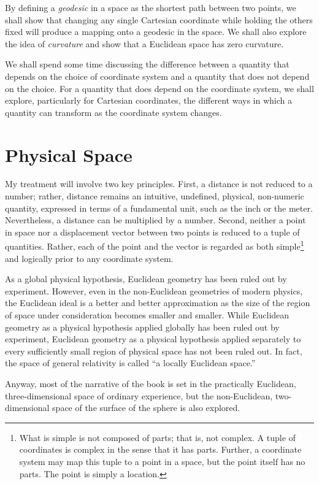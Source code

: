 By defining a \emph{geodesic} in a space as the shortest path between two
points, we shall show that changing any single Cartesian coordinate while
holding the others fixed will produce a mapping onto a geodesic in the space.
We shall also explore the idea of \emph{curvature} and show that a Euclidean
space has zero curvature.

We shall spend some time discussing the difference between a quantity that
depends on the choice of coordinate system and a quantity that does not depend
on the choice.  For a quantity that does depend on the coordinate system, we
shall explore, particularly for Cartesian coordinates, the different ways in
which a quantity can transform as the coordinate system changes.

\section{Physical Space}

My treatment will involve two key principles.  First, a distance is not reduced
to a number; rather, distance remains an intuitive, undefined, physical,
non-numeric quantity, expressed in terms of a fundamental unit, such as the
inch or the meter.  Nevertheless, a distance can be multiplied by a number.
Second, neither a point in space nor a displacement vector between two points
is reduced to a tuple of quantities.  Rather, each of the point and the vector
is regarded as both simple\footnote{%
   What is simple is not composed of parts; that is, not complex.  A tuple of
   coordinates is complex in the sense that it has parts.  Further, a
   coordinate system may map this tuple to a point in a space, but the point
   itself has no parts.  The point is simply a location.%
}
and logically prior to any coordinate system.

As a global physical hypothesis, Euclidean geometry has been ruled out by
experiment.
However, even in the non-Euclidean geometries of modern physics, the Euclidean
ideal is a better and better approximation as the size of the region of space
under consideration becomes smaller and smaller.  While Euclidean geometry as a
physical hypothesis applied globally has been ruled out by experiment,
Euclidean geometry as a physical hypothesis applied separately to every
sufficiently small region of physical space has not been ruled out.  In fact,
the space of general relativity is called ``a locally Euclidean space.''

Anyway, most of the narrative of the book is set in the practically Euclidean,
three-dimensional space of ordinary experience, but the non-Euclidean,
two-dimensional space of the surface of the sphere is also explored.

